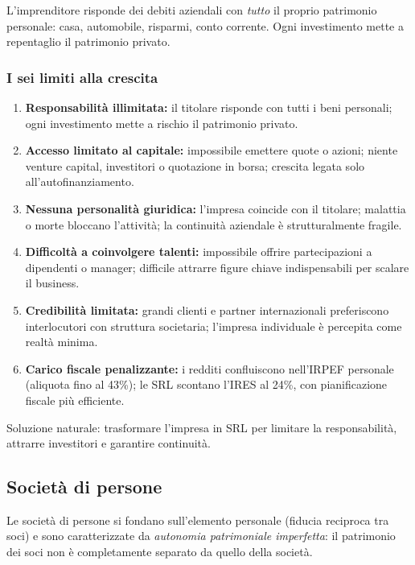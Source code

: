 \documentclass[a4paper,12pt]{article}
\begin{document}
	L'imprenditore risponde dei debiti aziendali con \emph{tutto} il proprio patrimonio personale: casa, automobile, risparmi, conto corrente.%
	Ogni investimento mette a repentaglio il patrimonio privato.
	
	\subsubsection{I sei limiti alla crescita}
	
	\begin{enumerate}
		\item \textbf{Responsabilità illimitata:} il titolare risponde con tutti i beni personali; ogni investimento mette a rischio il patrimonio privato.
		\item \textbf{Accesso limitato al capitale:} impossibile emettere quote o azioni; niente venture capital, investitori o quotazione in borsa; crescita legata solo all'autofinanziamento.
		\item \textbf{Nessuna personalità giuridica:} l'impresa coincide con il titolare; malattia o morte bloccano l'attività; la continuità aziendale è strutturalmente fragile.
		\item \textbf{Difficoltà a coinvolgere talenti:} impossibile offrire partecipazioni a dipendenti o manager; difficile attrarre figure chiave indispensabili per scalare il business.
		\item \textbf{Credibilità limitata:} grandi clienti e partner internazionali preferiscono interlocutori con struttura societaria; l'impresa individuale è percepita come realtà minima.
		\item \textbf{Carico fiscale penalizzante:} i redditi confluiscono nell'IRPEF personale (aliquota fino al 43\%); le SRL scontano l'IRES al 24\%, con pianificazione fiscale più efficiente.
	\end{enumerate}
	
	Soluzione naturale: trasformare l'impresa in SRL per limitare la responsabilità, attrarre investitori e garantire continuità.
	
	\subsection{Società di persone}
	
	Le società di persone si fondano sull'elemento personale (fiducia reciproca tra soci) e sono caratterizzate da \emph{autonomia patrimoniale imperfetta}: il patrimonio dei soci non è completamente separato da quello della società.
	
\end{document}
